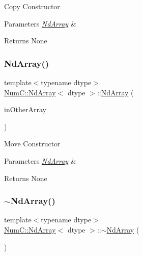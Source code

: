 Copy Constructor


\begin{DoxyParams}{Parameters}
{\em \mbox{\hyperlink{class_num_c_1_1_nd_array}{Nd\+Array}}} & \\
\hline
\end{DoxyParams}
\begin{DoxyReturn}{Returns}
None 
\end{DoxyReturn}
\mbox{\label{class_num_c_1_1_nd_array_a76b42e2d2e0224861d57baea97c65cb5}} 
\subsubsection{\texorpdfstring{Nd\+Array()}{NdArray()}\hspace{0.1cm}{\footnotesize\ttfamily [12/12]}}
{\footnotesize\ttfamily template$<$typename dtype$>$ \\
\mbox{\hyperlink{class_num_c_1_1_nd_array}{Num\+C\+::\+Nd\+Array}}$<$ dtype $>$\+::\mbox{\hyperlink{class_num_c_1_1_nd_array}{Nd\+Array}} (\begin{DoxyParamCaption}\item[{\mbox{\hyperlink{class_num_c_1_1_nd_array}{Nd\+Array}}$<$ dtype $>$ \&\&}]{in\+Other\+Array }\end{DoxyParamCaption})\hspace{0.3cm}{\ttfamily [inline]}}

Move Constructor


\begin{DoxyParams}{Parameters}
{\em \mbox{\hyperlink{class_num_c_1_1_nd_array}{Nd\+Array}}} & \\
\hline
\end{DoxyParams}
\begin{DoxyReturn}{Returns}
None 
\end{DoxyReturn}
\mbox{\label{class_num_c_1_1_nd_array_a13491803f306cd0908fd443e80074148}} 
\subsubsection{\texorpdfstring{$\sim$\+Nd\+Array()}{~NdArray()}}
{\footnotesize\ttfamily template$<$typename dtype$>$ \\
\mbox{\hyperlink{class_num_c_1_1_nd_array}{Num\+C\+::\+Nd\+Array}}$<$ dtype $>$\+::$\sim$\mbox{\hyperlink{class_num_c_1_1_nd_array}{Nd\+Array}} (\begin{DoxyParamCaption}{ }\end{DoxyParamCaption})\hspace{0.3cm}{\ttfamily [inline]}}

